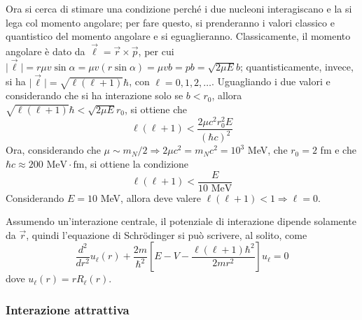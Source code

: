 \documentclass[11pt, a4paper]{scrartcl}
\theoremstyle{style}
\numberwithin{equation}{subsection}
\begin{document}
Ora si cerca di stimare una condizione perch\'e i due nucleoni interagiscano e la si lega col momento angolare; per fare questo, si prenderanno i valori classico e quantistico del momento angolare e si eguaglieranno.
Classicamente, il momento angolare \`e dato da $\vec{\ell } = \vec{r} \times  \vec{p}$, per cui $\lvert \vec{\ell } \rvert = r \mu  v \sin \alpha = \mu  v (r \sin \alpha ) = \mu  v b = p b = \sqrt{2 \mu  E}  b$; quantisticamente, invece, si ha $\lvert \vec{\ell } \rvert = \sqrt{\ell  ( \ell +1) } \hbar $, con $\ell =0,1,2,\ldots$.
Uguagliando i due valori e considerando che si ha interazione solo se $b < r_0$, allora $\sqrt{\ell (\ell +1)} \hbar < \sqrt{2 \mu  E}  r_0$, si ottiene che
\[
\ell  ( \ell  + 1) < \frac{2 \mu  c^2 r_0^2 E}{(\hbar c)^2}
\] 
Ora, considerando che $\mu  \sim m_N / 2\Rightarrow 2 \mu c^2 = m_N c^2 = 10^3$ MeV, che $r_0 = 2$ fm e che $\hbar c \approx 200 \text{ MeV}\cdot \text{fm}$, si ottiene la condizione
\begin{equation}
	\ell (\ell +1) < \frac{E}{10\text{ MeV}}
\end{equation}
Considerando $E =10$ MeV, allora deve valere $\ell (\ell +1) < 1 \Rightarrow \ell =0$.

Assumendo un'interazione centrale, il potenziale di interazione dipende solamente da $\vec{r}$, quindi l'equazione di Schr\"odinger si pu\`o scrivere, al solito, come
\[
\frac{d ^2}{d r^2} u_\ell (r)  + \frac{2m}{ \hbar ^2}\left[ E - V - \frac{\ell (\ell +1) \hbar ^2}{2mr^2} \right] u_\ell  = 0
\] 
dove $u_\ell (r) = r R_\ell (r)$.

\subsubsection{Interazione attrattiva}
\end{document}

